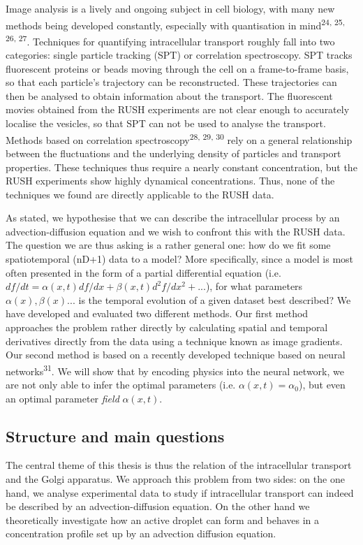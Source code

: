 \documentclass{Dissertate}
\begin{document}
Image analysis is a lively and ongoing subject in cell biology, with
many new methods being developed constantly, especially with
quantisation in
mind\textsuperscript{24, 25, 26, 27}.
Techniques for quantifying intracellular transport roughly fall into two
categories: single particle tracking (SPT) or correlation spectroscopy.
SPT tracks fluorescent proteins or beads moving through the cell on a
frame-to-frame basis, so that each particle's trajectory can be
reconstructed. These trajectories can then be analysed to obtain
information about the transport. The fluorescent movies obtained from
the RUSH experiments are not clear enough to accurately localise the
vesicles, so that SPT can not be used to analyse the transport. Methods
based on correlation
spectroscopy\textsuperscript{28, 29, 30} rely on a general relationship between the fluctuations and the
underlying density of particles and transport properties. These
techniques thus require a nearly constant concentration, but the RUSH
experiments show highly dynamical concentrations. Thus, none of the techniques we found
are directly applicable to the RUSH data.

\newpage

As stated, we hypothesise that we can describe the intracellular process
by an advection-diffusion equation and we wish to confront this with the
RUSH data. The question we are thus asking is a rather general one: how
do we fit some spatiotemporal (nD+1) data to a model? More specifically,
since a model is most often presented in the form of a partial
differential equation (i.e.
\(df/dt = \alpha(x, t) df/dx+\beta(x, t) d^2f/dx^2+...\)), for what parameters
\(\alpha(x), \beta(x)...\) is the temporal evolution of a given dataset best
described? We have developed and evaluated two different methods. Our
first method approaches the problem rather directly by calculating
spatial and temporal derivatives directly from the data using a
technique known as image gradients. Our second method is based on a
recently developed technique based on neural
networks\textsuperscript{31}. We will show that by encoding physics into
the neural network, we are not only able to infer the optimal
parameters (i.e. $\alpha(x,t)=\alpha_0$), but even an optimal parameter \emph{field} $\alpha(x,t)$.

\hypertarget{structure-and-main-questions}{%
\subsection{Structure and main
questions}\label{structure-and-main-questions}}
The central theme of this thesis is thus the relation of the intracellular transport and the Golgi apparatus. We approach this problem from two sides: on the one hand, we analyse experimental data to study if intracellular transport can indeed be described by an advection-diffusion equation. On the other hand we theoretically investigate how an active droplet can form and behaves in a concentration profile set up by an advection diffusion equation.
\end{document}

